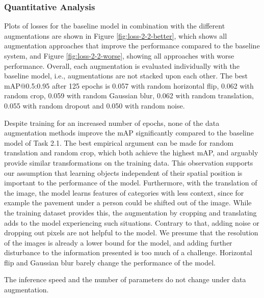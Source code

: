\documentclass{article}
\begin{document}
\subsubsection*{Quantitative Analysis}
Plots of losses for the baseline model in combination with the different augmentations are shown in Figure \ref{fig:loss-2-2-better}, which shows all augmentation approaches that improve the performance compared to the baseline system, and Figure \ref{fig:loss-2-2-worse}, showing all approaches with worse performance. Overall, each augmentation is evaluated individually with the baseline model, i.e., augmentations are not stacked upon each other. The best mAP@0.5:0.95 after 125 epochs is 0.057 with random horizontal flip, 0.062 with random crop, 0.059 with random Gaussian blur, 0.062 with random translation, 0.055 with random dropout and 0.050 with random noise.

Despite training for an increased number of epochs, none of the data augmentation methods improve the mAP significantly compared to the baseline model of Task 2.1. The best empirical argument can be made for random translation and random crop, which both achieve the highest mAP, and arguably provide similar transformations on the training data. This observation supports our assumption that learning objects independent of their spatial position is important to the performance of the model. Furthermore, with the translation of the image, the model learns features of categories with less context, since for example the pavement under a person could be shifted out of the image. While the training dataset provides this, the augmentation by cropping and translating adds to the model experiencing such situations. Contrary to that, adding noise or dropping out pixels are not helpful to the model. We presume that the resolution of the images is already a lower bound for the model, and adding further disturbance to the information presented is too much of a challenge. Horizontal flip and Gaussian blur barely change the performance of the model.

The inference speed and the number of parameters do not change under data augmentation.
\end{document}
